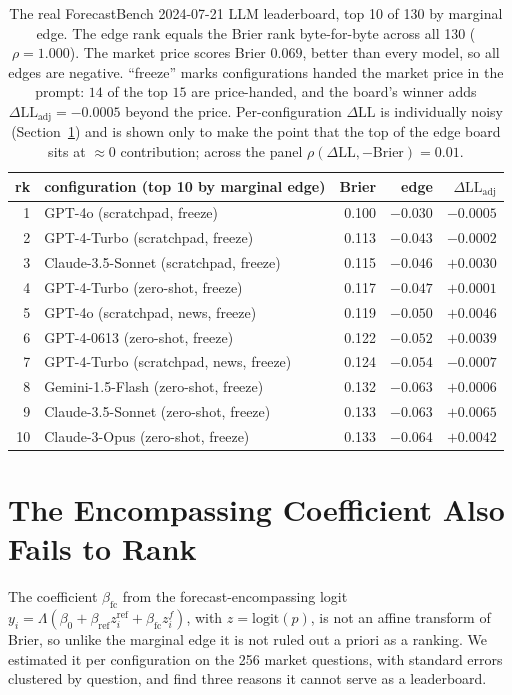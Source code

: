 \documentclass[11pt]{article}
\begin{document}
\begin{table}[t]\centering
\small
\begin{tabular}{rlrrr}
\toprule
rk & configuration (top 10 by marginal edge) & Brier & edge & $\Delta\mathrm{LL}_{\mathrm{adj}}$\\
\midrule
1 & GPT-4o (scratchpad, freeze) & 0.100 & $-0.030$ & $-0.0005$\\
2 & GPT-4-Turbo (scratchpad, freeze) & 0.113 & $-0.043$ & $-0.0002$\\
3 & Claude-3.5-Sonnet (scratchpad, freeze) & 0.115 & $-0.046$ & $+0.0030$\\
4 & GPT-4-Turbo (zero-shot, freeze) & 0.117 & $-0.047$ & $+0.0001$\\
5 & GPT-4o (scratchpad, news, freeze) & 0.119 & $-0.050$ & $+0.0046$\\
6 & GPT-4-0613 (zero-shot, freeze) & 0.122 & $-0.052$ & $+0.0039$\\
7 & GPT-4-Turbo (scratchpad, news, freeze) & 0.124 & $-0.054$ & $-0.0007$\\
8 & Gemini-1.5-Flash (zero-shot, freeze) & 0.132 & $-0.063$ & $+0.0006$\\
9 & Claude-3.5-Sonnet (zero-shot, freeze) & 0.133 & $-0.063$ & $+0.0065$\\
10 & Claude-3-Opus (zero-shot, freeze) & 0.133 & $-0.064$ & $+0.0042$\\
\bottomrule
\end{tabular}
\caption{The real ForecastBench 2024-07-21 LLM leaderboard, top 10 of 130 by marginal edge. The edge rank equals the Brier rank byte-for-byte across all 130 ($\rho=1.000$). The market price scores Brier $0.069$, better than every model, so all edges are negative. ``freeze'' marks configurations handed the market price in the prompt: $14$ of the top $15$ are price-handed, and the board's winner adds $\Delta\mathrm{LL}_{\mathrm{adj}}=-0.0005$ beyond the price. Per-configuration $\Delta\mathrm{LL}$ is individually noisy (Section~\ref{sec:beta}) and is shown only to make the point that the top of the edge board sits at $\approx\!0$ contribution; across the panel $\rho(\Delta\mathrm{LL},-\mathrm{Brier})=0.01$.}
\label{tab:worked}
\end{table}

\section{The Encompassing Coefficient Also Fails to Rank}
\label{sec:beta}
The coefficient $\beta_{\mathrm{fc}}$ from the forecast-encompassing logit $y_i = \Lambda(\beta_0 + \beta_{\mathrm{ref}} z^{\mathrm{ref}}_i + \beta_{\mathrm{fc}} z^f_i)$, with $z=\mathrm{logit}(p)$, is not an affine transform of Brier, so unlike the marginal edge it is not ruled out a priori as a ranking. We estimated it per configuration on the 256 market questions, with standard errors clustered by question, and find three reasons it cannot serve as a leaderboard.
\end{document}
